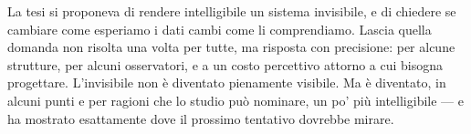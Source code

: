 La tesi si proponeva di rendere intelligibile un sistema invisibile, e di chiedere se cambiare come esperiamo i dati cambi come li comprendiamo. Lascia quella domanda non risolta una volta per tutte, ma risposta con precisione: per alcune strutture, per alcuni osservatori, e a un costo percettivo attorno a cui bisogna progettare. L'invisibile non è diventato pienamente visibile. Ma è diventato, in alcuni punti e per ragioni che lo studio può nominare, un po' più intelligibile --- e ha mostrato esattamente dove il prossimo tentativo dovrebbe mirare.
